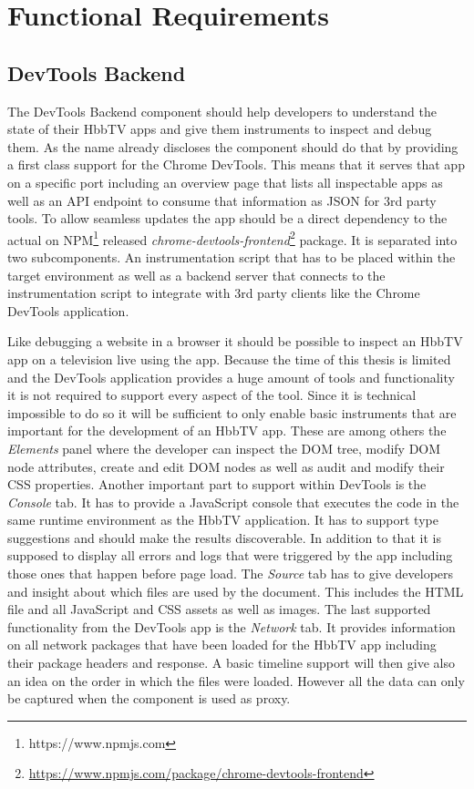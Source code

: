 \section{Functional Requirements\label{sec:reqsuba}}

\subsection{DevTools Backend}

The DevTools Backend component should help developers to understand the state of their HbbTV apps and give them instruments to inspect and debug them. As the name already discloses the component should do that by providing a first class support for the Chrome DevTools. This means that it serves that app on a specific port including an overview page that lists all inspectable apps as well as an API endpoint to consume that information as JSON for 3rd party tools. To allow seamless updates the app should be a direct dependency to the actual on NPM\footnote{https://www.npmjs.com} released \textit{chrome-devtools-frontend}\footnote{\url{https://www.npmjs.com/package/chrome-devtools-frontend}} package. It is separated into two subcomponents. An instrumentation script that has to be placed within the target environment as well as a backend server that connects to the instrumentation script to integrate with 3rd party clients like the Chrome DevTools application.

Like debugging a website in a browser it should be possible to inspect an HbbTV app on a television live using the app. Because the time of this thesis is limited and the DevTools application provides a huge amount of tools and functionality it is not required to support every aspect of the tool. Since it is technical impossible to do so it will be sufficient to only enable basic instruments that are important for the development of an HbbTV app. These are among others the \textit{Elements} panel where the developer can inspect the DOM tree, modify DOM node attributes, create and edit DOM nodes as well as audit and modify their CSS properties. Another important part to support within DevTools is the \textit{Console} tab. It has to provide a JavaScript console that executes the code in the same runtime environment as the HbbTV application. It has to support type suggestions and should make the results discoverable. In addition to that it is supposed to display all errors and logs that were triggered by the app including those ones that happen before page load. The \textit{Source} tab has to give developers and insight about which files are used by the document. This includes the HTML file and all JavaScript and CSS assets as well as images. The last supported functionality from the DevTools app is the \textit{Network} tab. It provides information on all network packages that have been loaded for the HbbTV app including their package headers and response. A basic timeline support will then give also an idea on the order in which the files were loaded. However all the data can only be captured when the component is used as proxy.


